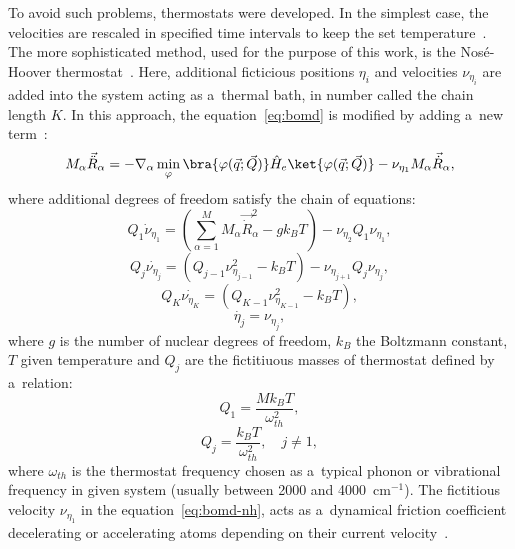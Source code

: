 To avoid such problems, thermostats were developed. In the simplest case, the velocities are rescaled in specified time intervals to keep the set temperature~\cite{piela}. The more sophisticated method, used for the purpose of this work, is the Nos\'{e}-Hoover thermostat~\cite{ab-initio-marx-hutter,nose-hoover-1,nose-hoover-2,nose-hoover-3}. Here, additional ficticious positions $\eta_i$ and velocities $\nu_{\eta_i}$ are added into the system acting as a~thermal bath, in number called the chain length $K$. In this approach, the equation~\ref{eq:bomd} is modified by adding a~new term~\cite{nose-hoover-4,nose-hoover-5,nose-hoover-6}:
\begin{equation}
    M_{\alpha} \vec{\ddot{R}}_{\alpha} = -\nabla_{\alpha} \min_{\varphi} \bra{\varphi(\vec{q}; \vec{Q})} \hat{H}_e \ket{\varphi(\vec{q}; \vec{Q})} - \nu_{\eta_1} M_{\alpha} \vec{\dot{R}}_{\alpha},
    \label{eq:bomd-nh}
\end{equation}
where additional degrees of freedom satisfy the chain of equations:
\begin{equation}
    Q_1 \dot{\nu}_{\eta_1} = \left( \sum_{\alpha = 1}^M M_{\alpha} \vec{\dot{R}}^2_{\alpha} - gk_BT \right) - \nu_{\eta_2} Q_1 \nu_{\eta_1},
\end{equation}
\begin{equation}
    Q_j \dot{\nu_{\eta_j}} = \left( Q_{j - 1} \nu^2_{\eta_{j - 1}} - k_B T \right) - \nu_{\eta_{j + 1}} Q_j \nu_{\eta_j},
\end{equation}
\begin{equation}
    Q_K \dot{\nu_{\eta_K}} = \left( Q_{K - 1} \nu^2_{\eta_{K - 1}} - k_B T \right),
\end{equation}
\begin{equation}
    \dot{\eta_j} = \nu_{\eta_j},
\end{equation}
where $g$ is the number of nuclear degrees of freedom, $k_B$ the Boltzmann constant, $T$ given temperature and $Q_j$ are the fictitiuous masses of thermostat defined by a~relation:
\begin{equation}
    Q_1 = \frac{M k_B T}{\omega^2_{th}},
\end{equation}
\begin{equation}
    Q_j = \frac{k_B T}{\omega^2_{th}}, \quad j \neq 1,
\end{equation}
where $\omega_{th}$ is the thermostat frequency chosen as a~typical phonon or vibrational frequency in given system (usually between 2000 and 4000~cm$^{-1}$). The fictitious velocity $\nu_{\eta_1}$ in the equation~\ref{eq:bomd-nh}, acts as a~dynamical friction coefficient decelerating or accelerating atoms depending on their current velocity~\cite{nose-hoover-1}.

